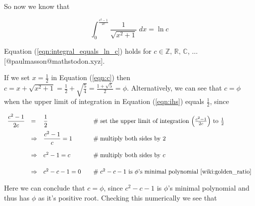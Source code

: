 \documentclass{article}
\theoremstyle{definition}
\begin{document}
\bigskip
\noindent
So now we know that


\begin{equation}
\int_{0}^{\frac{c^2 -1}{2c}} \dfrac{1}{\sqrt{x^{2} + 1}} \; dx = \ln c
\label{eqn:integral_equals_ln_c}
\end{equation}

\bigskip
\bigskip
\noindent
Equation (\ref{eqn:integral_equals_ln_c}) holds for $c \in \mathbb{Z}, 
\, \mathbb{R}, \, \mathbb{C}$, $\hdots$ [@paulmasson@mathstodon.xyz].

\bigskip
\noindent
If we set $x = \frac{1}{2}$ in Equation (\ref{eqn:c})
then $c = x + \sqrt{x^2+1} = \frac{1}{2} + \sqrt{\frac{5}{4}} = 
\frac{1 + \sqrt{5}}{2} = \phi$. Alternatively, we can see that 
$c = \phi$ when the upper limit of integration in
Equation (\ref{eqn:ihs}) equals $\frac{1}{2}$, 
since

\medskip
\begin{equation*}
\begin{array}{llll}
\dfrac{c^2 -1}{2c}
&=& \dfrac{1}{2}			
				&\hspace{1em} \mathrel{\#} \text{set the upper limit of integration 
					$\left ( \frac{c^2 -1}{2c} \right )$ to $\frac{1}{2}$} \\
[10pt]
&\Rightarrow& \dfrac{c^2 -1}{c}	= 1 		
				&\hspace{1em} \mathrel{\#} \text{multiply both sides by 2} \\
[15pt]
&\Rightarrow& c^2 -1 = c 		
				&\hspace{1em} \mathrel{\#} \text{multiply both sides by $c$} \\
[15pt]
&\Rightarrow& c^2 -c -1 = 0		
				&\hspace{1em} \mathrel{\#} \text{$c^2-c-1$ is $\phi$'s 
								minimal polynomial \cite{wiki:golden_ratio}} \\
\end{array}
\end{equation*}

\bigskip
\noindent
Here we can conclude that $c = \phi$, since $c^2 -c -1$ is $\phi$'s 
minimal polynomial and thus has $\phi$ as it's positive root. 
Checking this numerically we see that 
\end{document}
